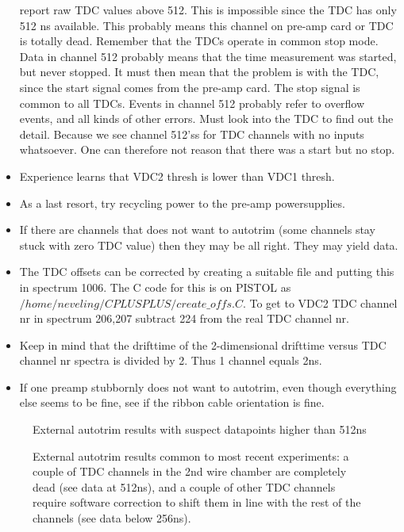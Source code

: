 \documentclass[11pt]{report}
\begin{document}
\begin{itemize}
report raw TDC values above 512. This is impossible since the TDC has
only 512 ns available. 
This probably means this channel on pre-amp card or TDC 
is totally dead. 
Remember that the TDCs operate in common stop mode. Data in channel
512 probably means that the time measurement was started, but never stopped. 
It must then
mean that the problem is with the TDC, since the start signal comes from 
the pre-amp card. The stop signal is common to all TDCs.
Events in channel 512 probably refer to overflow events, and all kinds of other
errors. Must look into the TDC to find out the detail.
Because we see channel 512'ss for TDC channels with no inputs whatsoever. One 
can therefore not reason that there was a start but no stop.
\item Experience learns that VDC2 thresh is lower than VDC1 thresh.
\item As a last resort, try recycling power to the pre-amp powersupplies.
\item If there are channels that does not want to autotrim (some channels 
stay stuck with zero TDC value) then they may be all right. They may yield data.
\item The TDC offsets can be corrected by creating a suitable file and
putting this in spectrum 1006. The C code for this is on PISTOL as
$/home/neveling/CPLUSPLUS/create\_offs.C$. To get to VDC2 TDC channel nr in spectrum 206,207 subtract 224 from the real TDC channel nr.
\item Keep in mind that the drifttime of the 2-dimensional drifttime versus TDC channel nr spectra is divided by 2. Thus 1 channel equals 2ns.
\item If one preamp stubbornly does not want to autotrim, even though everything else seems to be fine, see if the ribbon cable orientation is fine.

\end{itemize}

\begin{figure}[!ht]
\centerline{\vspace{0cm}\hspace{0cm}
}
\centering
\caption{External autotrim results with suspect datapoints higher than 512ns}
\label{fig:autotrim1}
\end{figure} 

\begin{figure}[!ht]
\centerline{\vspace{0cm}\hspace{0cm}
}
\centering
\caption{External autotrim results common to most recent experiments: a couple of
TDC channels in the 2nd wire chamber are completely dead (see data at 512ns), and 
a couple of other TDC channels require software correction to shift them
in line with the rest of the channels (see data below 256ns). }
\label{fig:autotrim2}
\end{figure} 
\end{document}
